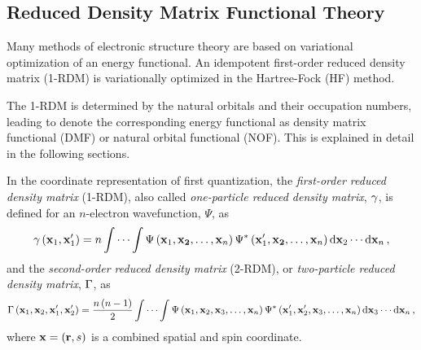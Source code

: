 \subsection{Reduced Density Matrix Functional Theory} %

Many methods of electronic structure theory are based on variational
optimization of an energy functional.
An idempotent first-order reduced density matrix (1-RDM) is variationally
optimized in the Hartree-Fock (HF) method.

The 1-RDM is determined by the natural orbitals and their occupation
numbers, leading to denote the corresponding energy
functional as density matrix functional (DMF) or natural orbital functional (NOF).
This is explained in detail in the following sections.


In the coordinate representation of first quantization,
the \textit{first-order reduced density matrix} (1-RDM), also called
\textit{one-particle reduced density matrix}, $\gamma$, is defined
for an $n$-electron wavefunction, $\Psi$, as
\begin{equation} \label{eq:fordm-coordinate-representation}
    \gamma \left( \boldsymbol{\mathrm{x}}_1, \boldsymbol{\mathrm{x}}_1^{\prime} \right) =
    n \idotsint
    \Psi \left( \boldsymbol{\mathrm{x}}_1, \boldsymbol{\mathrm{x_2}}, \ldots,  \boldsymbol{\mathrm{x}}_n \right)
    \Psi^{*} \left( \boldsymbol{\mathrm{x}}_1^{\prime}, \boldsymbol{\mathrm{x_2}}, \ldots,  \boldsymbol{\mathrm{x}}_n \right)
    \dd{ \boldsymbol{\mathrm{x}}_2} \cdots \dd{ \boldsymbol{\mathrm{x}}_n}
    ,
\end{equation}
and the \textit{second-order reduced density matrix} (2-RDM), or
\textit{two-particle reduced density matrix}, $\Gamma$, as 
\begin{equation} \label{eq:sordm-coordinate-representation}
    \Gamma \left( \boldsymbol{\mathrm{x}}_1, \boldsymbol{\mathrm{x}}_2, \boldsymbol{\mathrm{x}}_1^{\prime}, \boldsymbol{\mathrm{x}}_2^{\prime} \right)
    =
    \frac{n\left( n - 1 \right)}{2} \idotsint
    \Psi \left( \boldsymbol{\mathrm{x}}_1, \boldsymbol{\mathrm{x}}_2, \boldsymbol{\mathrm{x}}_3, \ldots,  \boldsymbol{\mathrm{x}}_n \right)
    \Psi^{*} \left( \boldsymbol{\mathrm{x}}_1^{\prime}, \boldsymbol{\mathrm{x}}_2^{\prime}, \boldsymbol{\mathrm{x}}_3, \ldots,  \boldsymbol{\mathrm{x}}_n \right)
    \dd{ \boldsymbol{\mathrm{x}}_3} \cdots \dd{ \boldsymbol{\mathrm{x}}_n}
    ,
\end{equation}
where $ \boldsymbol{\mathrm{x}} = \left( \boldsymbol{\mathrm{r}}, s \right)$ is a combined spatial and spin
coordinate.

